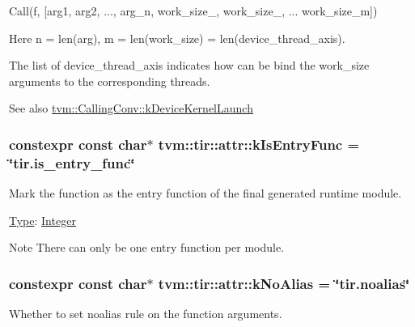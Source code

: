 Call(f, \mbox{[}arg1, arg2, ..., arg\+\_\+n, work\+\_\+size\+\_, work\+\_\+size\+\_, ... work\+\_\+size\+\_\+m\mbox{]})

Here n = len(arg), m = len(work\+\_\+size) = len(device\+\_\+thread\+\_\+axis).

The list of device\+\_\+thread\+\_\+axis indicates how can be bind the work\+\_\+size arguments to the corresponding threads.

\begin{DoxySeeAlso}{See also}
\hyperlink{namespacetvm_a85e4536ea4e1c8d3d48c61135f0a8ff0aea7c0ea92da6200bb14ea17a6094e2bc}{tvm\+::\+Calling\+Conv\+::k\+Device\+Kernel\+Launch} 
\end{DoxySeeAlso}
\subsubsection[{\texorpdfstring{k\+Is\+Entry\+Func}{kIsEntryFunc}}]{\setlength{\rightskip}{0pt plus 5cm}constexpr const char$\ast$ tvm\+::tir\+::attr\+::k\+Is\+Entry\+Func = \char`\"{}tir.\+is\+\_\+entry\+\_\+func\char`\"{}}\hypertarget{namespacetvm_1_1tir_1_1attr_a489d0cebd2820025bc3d6c5a9011cdd4}{}\label{namespacetvm_1_1tir_1_1attr_a489d0cebd2820025bc3d6c5a9011cdd4}


Mark the function as the entry function of the final generated runtime module. 

\hyperlink{classtvm_1_1Type}{Type}\+: \hyperlink{classtvm_1_1Integer}{Integer}

\begin{DoxyNote}{Note}
There can only be one entry function per module. 
\end{DoxyNote}
\subsubsection[{\texorpdfstring{k\+No\+Alias}{kNoAlias}}]{\setlength{\rightskip}{0pt plus 5cm}constexpr const char$\ast$ tvm\+::tir\+::attr\+::k\+No\+Alias = \char`\"{}tir.\+noalias\char`\"{}}\hypertarget{namespacetvm_1_1tir_1_1attr_ac74386674da85bc4b4dd1ee28a97ff63}{}\label{namespacetvm_1_1tir_1_1attr_ac74386674da85bc4b4dd1ee28a97ff63}


Whether to set noalias rule on the function arguments. 

